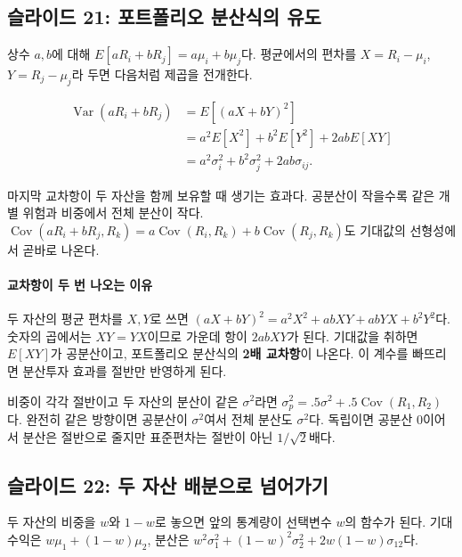 \documentclass[11pt,a4paper]{article}
\begin{document}
\subsection{슬라이드 21: 포트폴리오 분산식의 유도}

상수 $a,b$에 대해 $E[aR_i+bR_j]=a\mu_i+b\mu_j$다. 평균에서의 편차를 $X=R_i-\mu_i$, $Y=R_j-\mu_j$라 두면 다음처럼 제곱을 전개한다.
\par

\[
\begin{aligned}
\operatorname{Var}(aR_i+bR_j)&=E[(aX+bY)^2]\\
&=a^2E[X^2]+b^2E[Y^2]+2abE[XY]\\
&=a^2\sigma_i^2+b^2\sigma_j^2+2ab\sigma_{ij}.
\end{aligned}
\]

마지막 교차항이 두 자산을 함께 보유할 때 생기는 효과다. 공분산이 작을수록 같은 개별 위험과 비중에서 전체 분산이 작다. $\operatorname{Cov}(aR_i+bR_j,R_k)=a\operatorname{Cov}(R_i,R_k)+b\operatorname{Cov}(R_j,R_k)$도 기대값의 선형성에서 곧바로 나온다.
\par

\paragraph{교차항이 두 번 나오는 이유}

두 자산의 평균 편차를 $X,Y$로 쓰면 $(aX+bY)^2=a^2X^2+abXY+abYX+b^2Y^2$다. 숫자의 곱에서는 $XY=YX$이므로 가운데 항이 $2abXY$가 된다. 기대값을 취하면 $E[XY]$가 공분산이고, 포트폴리오 분산식의 \textbf{2배 교차항}이 나온다. 이 계수를 빠뜨리면 분산투자 효과를 절반만 반영하게 된다.
\par

비중이 각각 절반이고 두 자산의 분산이 같은 $\sigma^2$라면 $\sigma_p^2=.5\sigma^2+.5\operatorname{Cov}(R_1,R_2)$다. 완전히 같은 방향이면 공분산이 $\sigma^2$여서 전체 분산도 $\sigma^2$다. 독립이면 공분산 0이어서 분산은 절반으로 줄지만 표준편차는 절반이 아닌 $1/\sqrt2$배다.
\par

\subsection{슬라이드 22: 두 자산 배분으로 넘어가기}

두 자산의 비중을 $w$와 $1-w$로 놓으면 앞의 통계량이 선택변수 $w$의 함수가 된다. 기대수익은 $w\mu_1+(1-w)\mu_2$, 분산은 $w^2\sigma_1^2+(1-w)^2\sigma_2^2+2w(1-w)\sigma_{12}$다.
\par
\end{document}
